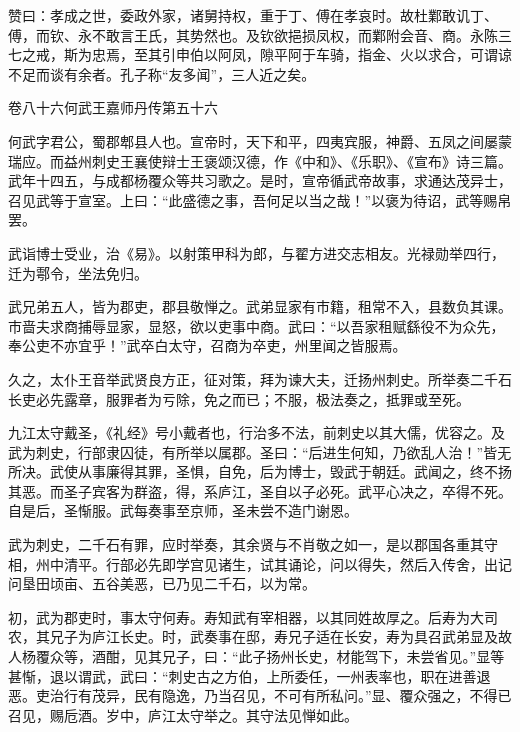 \documentclass[12pt,UTF8]{ctexbook}
\begin{document}
赞曰：孝成之世，委政外家，诸舅持权，重于丁、傅在孝哀时。故杜鄴敢讥丁、傅，而钦、永不敢言王氏，其势然也。及钦欲挹损凤权，而鄴附会音、商。永陈三七之戒，斯为忠焉，至其引申伯以阿凤，隙平阿于车骑，指金、火以求合，可谓谅不足而谈有余者。孔子称“友多闻”，三人近之矣。





卷八十六何武王嘉师丹传第五十六



何武字君公，蜀郡郫县人也。宣帝时，天下和平，四夷宾服，神爵、五凤之间屡蒙瑞应。而益州刺史王襄使辩士王褒颂汉德，作《中和》、《乐职》、《宣布》诗三篇。武年十四五，与成都杨覆众等共习歌之。是时，宣帝循武帝故事，求通达茂异士，召见武等于宣室。上曰：“此盛德之事，吾何足以当之哉！”以褒为待诏，武等赐帛罢。



武诣博士受业，治《易》。以射策甲科为郎，与翟方进交志相友。光禄勋举四行，迁为鄠令，坐法免归。



武兄弟五人，皆为郡吏，郡县敬惮之。武弟显家有市籍，租常不入，县数负其课。市啬夫求商捕辱显家，显怒，欲以吏事中商。武曰：“以吾家租赋繇役不为众先，奉公吏不亦宜乎！”武卒白太守，召商为卒吏，州里闻之皆服焉。



久之，太仆王音举武贤良方正，征对策，拜为谏大夫，迁扬州刺史。所举奏二千石长吏必先露章，服罪者为亏除，免之而已；不服，极法奏之，抵罪或至死。



九江太守戴圣，《礼经》号小戴者也，行治多不法，前刺史以其大儒，优容之。及武为刺史，行部隶囚徒，有所举以属郡。圣曰：“后进生何知，乃欲乱人治！”皆无所决。武使从事廉得其罪，圣惧，自免，后为博士，毁武于朝廷。武闻之，终不扬其恶。而圣子宾客为群盗，得，系庐江，圣自以子必死。武平心决之，卒得不死。自是后，圣惭服。武每奏事至京师，圣未尝不造门谢恩。



武为刺史，二千石有罪，应时举奏，其余贤与不肖敬之如一，是以郡国各重其守相，州中清平。行部必先即学宫见诸生，试其诵论，问以得失，然后入传舍，出记问垦田顷亩、五谷美恶，已乃见二千石，以为常。



初，武为郡吏时，事太守何寿。寿知武有宰相器，以其同姓故厚之。后寿为大司农，其兄子为庐江长史。时，武奏事在邸，寿兄子适在长安，寿为具召武弟显及故人杨覆众等，酒酣，见其兄子，曰：“此子扬州长史，材能驾下，未尝省见。”显等甚惭，退以谓武，武曰：“刺史古之方伯，上所委任，一州表率也，职在进善退恶。吏治行有茂异，民有隐逸，乃当召见，不可有所私问。”显、覆众强之，不得已召见，赐卮酒。岁中，庐江太守举之。其守法见惮如此。
\end{document}
